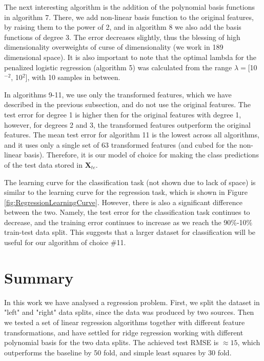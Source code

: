 \documentclass{article} %
\begin{document}
The next interesting algorithm is the addition of the polynomial basis functions in algorithm 7. There, we add non-linear basis function to the original features, by raising them to the power of 2, and in algorithm 8 we also add the basis functions of degree 3. The error decreases slightly, thus the blessing of high dimensionality overweights of curse of dimensionality (we work in 189 dimensional space). It is also important to note that the optimal lambda for the penalized logistic regression (algorithm 5) was calculated from the range $\lambda=$[10$^{-2}$, 10$^{2}$], with 10 samples in between.%

In algorithms 9-11, we use only the transformed features, which we have described in the previous subsection, and do not use the original features. The test error for degree 1 is higher then for the original features with degree 1, however, for degrees 2 and 3, the transformed features outperform the original features. The mean test error for algorithm 11 is the lowest across all algorithms, and it uses only a single set of 63 transformed features (and cubed for the non-linear basis). Therefore, it is our model of choice for making the class predictions of the test data stored in $\mathbf{X}_{te}$.

The learning curve for the classification task (not shown due to lack of space) is similar to the learning curve for the regression task, which is shown in Figure \ref{fig:RegressionLearningCurve}. However, there is also a significant difference between the two. Namely, the test error for the classification task continues to decrease, and the training error continues to increase as we reach the 90\%-10\% train-test data split. This suggests that a larger dataset for classification will be useful for our algorithm of choice \#11.

\section{Summary}

In this work we have analysed a regression problem. First, we split the dataset in "left" and "right" data splits, since the data was produced by two sources. Then we tested a set of linear regression algorithms together with different feature transformations, and have settled for ridge regression working with different polynomial basis for the two data splits. The achieved test RMSE is $\approx15$, which outperforms the baseline by 50 fold, and simple least squares by 30 fold.
\end{document}
